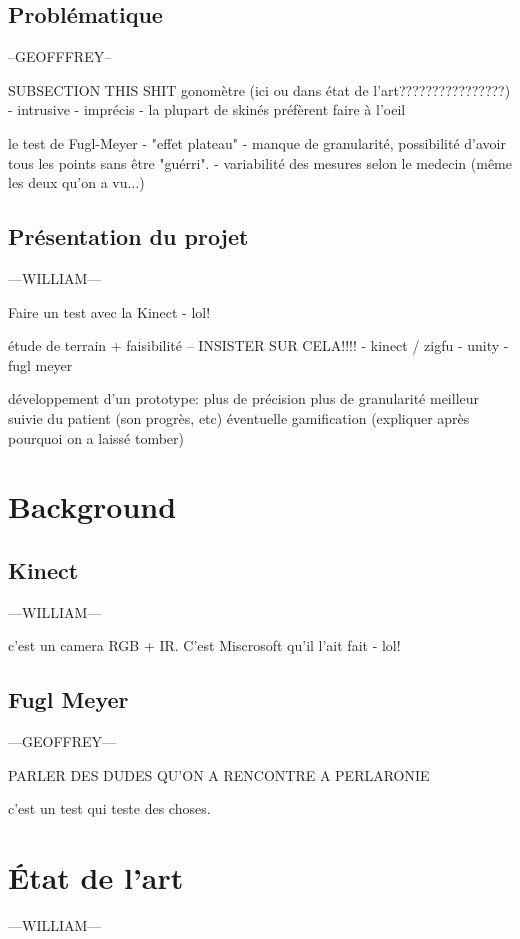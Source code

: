 \documentclass{report}
\begin{document}
		\section{Problématique} --GEOFFFREY--
		
		SUBSECTION THIS SHIT
		gonomètre (ici ou dans état de l'art????????????????)
		- intrusive
		- imprécis
		- la plupart de skinés préfèrent faire à l'oeil
		
		le test de Fugl-Meyer
		- "effet plateau" - manque de granularité, possibilité d'avoir tous les points sans être "guérri".
		- variabilité des mesures selon le medecin (même les deux qu'on a vu...)
		
	\newpage
		\section{Présentation du projet} 		---WILLIAM---

		Faire un test avec la Kinect - lol!
		
		étude de terrain + faisibilité -- INSISTER SUR CELA!!!!
		- kinect / zigfu
		- unity
		- fugl meyer
		
		développement d'un prototype:
		plus de précision
		plus de granularité
		meilleur suivie du patient (son progrès, etc)
		éventuelle gamification (expliquer après pourquoi on a laissé tomber)
		
		
	\chapter{Background}
		\section{Kinect} 		---WILLIAM---
		
		c'est un camera RGB + IR. C'est Miscrosoft qu'il l'ait fait - lol!
		
		\section{Fugl Meyer} 		---GEOFFREY---
		
		PARLER DES DUDES QU'ON A RENCONTRE A PERLARONIE
		
		
		c'est un test qui teste des choses.
		
	\chapter{État de l'art} 		---WILLIAM---
	
\end{document}
